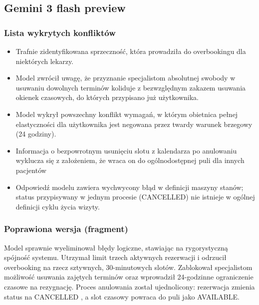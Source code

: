\documentclass[12pt,a4paper]{article}
\begin{document}
\subsection{\textcolor{geminicolor}{Gemini 3 flash preview} }

\subsubsection{Lista wykrytych konfliktów}
\begin{itemize}
    \item[-] Trafnie zidentyfikowana sprzeczność, która prowadziła do overbookingu dla niektórych lekarzy.
    
    \item[-] Model zwrócił uwagę, że przyznanie specjalistom absolutnej swobody w usuwaniu dowolnych terminów koliduje z bezwzględnym zakazem usuwania okienek czasowych, do których przypisano już użytkownika.
    
    \item[-] Model wykrył powszechny konflikt wymagań, w którym obietnica pełnej elastyczności dla użytkownika jest negowana przez twardy warunek brzegowy (24 godziny).
    
    \item[-] Informacja o bezpowrotnym usunięciu slotu z kalendarza po anulowaniu wyklucza się z założeniem, że wraca on do ogólnodostępnej puli dla innych pacjentów
    
    \item[-] Odpowiedź modelu zawiera wychwycony błąd w definicji maszyny stanów; status przypisywany w jednym procesie (CANCELLED) nie istnieje w ogólnej definicji cyklu życia wizyty.
\end{itemize}


\subsubsection{Poprawiona wersja (fragment)}
\small
Model sprawnie wyeliminował błędy logiczne, stawiając na rygorystyczną spójność systemu. Utrzymał limit trzech aktywnych rezerwacji i odrzucił overbooking na rzecz sztywnych, 30-minutowych slotów. Zablokował specjalistom możliwość usuwania zajętych terminów oraz wprowadził 24-godzinne ograniczenie czasowe na rezygnację. Proces anulowania został ujednolicony: rezerwacja zmienia status na CANCELLED , a slot czasowy powraca do puli jako AVAILABLE.
\normalsize
\end{document}
